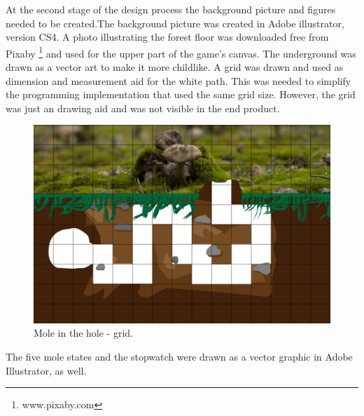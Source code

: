 At the second stage of the design process the background picture and figures needed to be created.The background picture was created in Adobe illustrator, version CS4. A photo illustrating the forest floor was downloaded free from Pixaby \footnote{www.pixaby.com} and used for the upper part of the game’s canvas. The underground was drawn as a vector art to make it more childlike. 
A grid was drawn and used as dimension and measurement aid for the white path. This was needed to simplify the programming implementation that used the same grid size. However, the grid was just an drawing aid and was not visible in the end product.

\begin{figure}[h]  %
  \centering
  \includegraphics[width=.5\textwidth]{figures/Mole-in-the-hole-800x1200-GRID.jpg}
  \caption[Mole in the hole grid.]{Mole in the hole - grid.}
  \label{fig:mole-in-the-hole-800x1200-GRID}
\end{figure}

The five mole states and the stopwatch were drawn as a vector graphic in Adobe Illustrator, as well.

